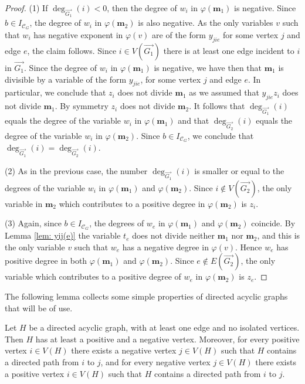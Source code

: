 \begin{proof}
     (1) If $\deg_{\overrightarrow{G_1}}(i)<0$, then the degree of $w_i$ in $\varphi(\mathbf{m}_1)$ is negative. Since $b\in I_{\mathcal{C}_G}$, the degree of $w_i$ in $\varphi(\mathbf{m}_2)$ is also negative. As the only variables $v$ such that $w_i$ has negative exponent in $\varphi(v)$ are of the form $y_{jie}$ for some vertex $j$ and edge $e$, the claim follows. Since $i\in V(\overrightarrow{G_1})$ there is at least one edge incident to $i$ in $\overrightarrow{G_1}$. Since the degree of $w_i$ in $\varphi(\mathbf{m}_1)$ is negative, we have then that $\mathbf{m}_1$ is divisible by a variable of the form $y_{jie}$, for some vertex $j$ and edge $e$. In particular, we conclude that $z_i$ does not divide $\mathbf{m}_1$ as we assumed that $y_{jie}z_i$ does not divide $\mathbf{m}_1$. By symmetry $z_i$ does not divide $\mathbf{m}_2$. It follows that $\deg_{\overrightarrow{G_1}}(i)$ equals the degree of the variable $w_i$ in $\varphi(\mathbf{m}_1)$ and that $\deg_{\overrightarrow{G_2}}(i)$ equals the degree of the variable $w_i$ in $\varphi(\mathbf{m}_2)$. Since $b\in I_{\mathcal{C}_G}$, we conclude that $\deg_{\overrightarrow{G_1}}(i)=\deg_{\overrightarrow{G_2}}(i)$. 
          
     (2) As in the previous case, the number $\deg_{\overrightarrow{G_1}}(i)$ is smaller or equal to the degrees of the variable $w_i$ in $\varphi(\mathbf{m}_1)$ and $\varphi(\mathbf{m}_2)$. Since $i\notin V(\overrightarrow{G_2})$, the only variable in $\mathbf{m}_2$ which contributes to a positive degree in $\varphi(\mathbf{m}_2)$ is $z_i$. 
     
     (3) Again, since $b\in I_{\mathcal{C}_G}$, the degrees of $w_e$ in $\varphi(\mathbf{m}_1)$ and $\varphi(\mathbf{m}_2)$ coincide. By Lemma \ref{lem: yij(e)} the variable $t_e$ does not divide neither $\mathbf{m}_1$ nor $\mathbf{m}_2$, and this is the only variable $v$ such that $w_e$ has a negative degree in $\varphi(v)$. Hence $w_e$ has positive degree in both $\varphi(\mathbf{m}_1)$ and $\varphi(\mathbf{m}_2)$. Since $e\notin E(\overrightarrow{G_2})$, the only variable which contributes to a positive degree of $w_e$ in $\varphi(\mathbf{m}_2)$ is $z_e$.
\end{proof}

The following lemma collects some simple properties of directed acyclic graphs that will be of use.

\begin{lemm}\label{lem: directed acyclic properties}
    Let $H$ be a directed acyclic graph, with at least one edge and no isolated vertices. Then $H$ has at least a positive and a negative vertex. Moreover, for every positive vertex $i\in V(H)$ there exists a negative vertex $j\in V(H)$ such that $H$ contains a directed path from $i$ to $j$, and for every negative vertex $j\in V(H)$ there exists a positive vertex $i\in V(H)$ such that $H$ contains a directed path from $i$ to $j$.
\end{lemm}

